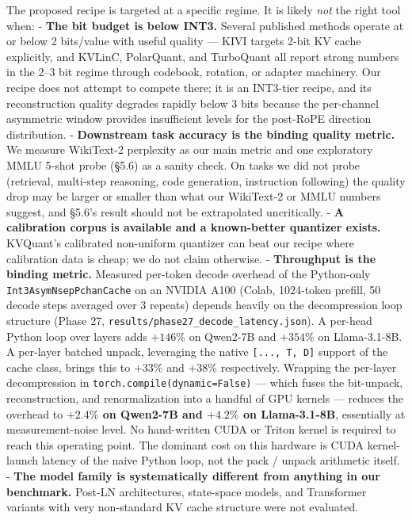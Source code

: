 The proposed recipe is targeted at a specific regime. It is likely
\emph{not} the right tool when: - \textbf{The bit budget is below INT3.}
Several published methods operate at or below 2 bits/value with useful
quality --- KIVI targets 2-bit KV cache explicitly, and KVLinC,
PolarQuant, and TurboQuant all report strong numbers in the 2--3 bit
regime through codebook, rotation, or adapter machinery. Our recipe does
not attempt to compete there; it is an INT3-tier recipe, and its
reconstruction quality degrades rapidly below 3 bits because the
per-channel asymmetric window provides insufficient levels for the
post-RoPE direction distribution. - \textbf{Downstream task accuracy is
the binding quality metric.} We measure WikiText-2 perplexity as our
main metric and one exploratory MMLU 5-shot probe (§5.6) as a sanity
check. On tasks we did not probe (retrieval, multi-step reasoning, code
generation, instruction following) the quality drop may be larger or
smaller than what our WikiText-2 or MMLU numbers suggest, and §5.6's
result should not be extrapolated uncritically. - \textbf{A calibration
corpus is available and a known-better quantizer exists.} KVQuant's
calibrated non-uniform quantizer can beat our recipe where calibration
data is cheap; we do not claim otherwise. - \textbf{Throughput is the
binding metric.} Measured per-token decode overhead of the Python-only
\texttt{Int3AsymNsepPchanCache} on an NVIDIA A100 (Colab, 1024-token
prefill, 50 decode steps averaged over 3 repeats) depends heavily on the
decompression loop structure (Phase 27,
\texttt{results/phase27\_decode\_latency.json}). A per-head Python loop
over layers adds \(+146 \%\) on Qwen2-7B and \(+354 \%\) on
Llama-3.1-8B. A per-layer batched unpack, leveraging the native
\texttt{{[}...,\ T,\ D{]}} support of the cache class, brings this to
\(+33 \%\) and \(+38 \%\) respectively. Wrapping the per-layer
decompression in \texttt{torch.compile(dynamic=False)} --- which fuses
the bit-unpack, reconstruction, and renormalization into a handful of
GPU kernels --- reduces the overhead to \textbf{\(+2.4 \%\) on Qwen2-7B
and \(+4.2 \%\) on Llama-3.1-8B}, essentially at measurement-noise
level. No hand-written CUDA or Triton kernel is required to reach this
operating point. The dominant cost on this hardware is CUDA
kernel-launch latency of the naive Python loop, not the pack / unpack
arithmetic itself. - \textbf{The model family is systematically
different from anything in our benchmark.} Post-LN architectures,
state-space models, and Transformer variants with very non-standard KV
cache structure were not evaluated.

